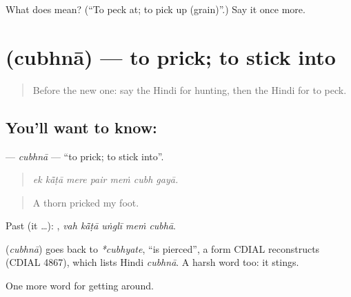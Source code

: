 \begin{tcolorbox}[breakable,colback=teal!4,colframe=teal!35!black,title={Before you move on}]
What does  mean? (\textquotedblleft{}To peck at; to pick up (grain)\textquotedblright{}.) Say it once more.
\end{tcolorbox}
\section[\texorpdfstring{\hi{चुभना} (cubhnā)}{चुभना (cubhnā)}]{ (cubhnā) — to prick; to stick into}

\label{lesson:HI-C448-cubhna}



\begin{quote}
Before the new one: say the Hindi for hunting, then the Hindi for to peck.
\end{quote}

\subsection*{You'll want to know: }
\textbf{} — \emph{cubhnā} — \textquotedblleft{}to prick; to stick into\textquotedblright{}.

\begin{quote}
      
\end{quote}

\begin{quote}
\emph{ek kā̃ṭā mere pair meṁ cubh gayā.}
\end{quote}

\begin{quote}
A thorn pricked my foot.
\end{quote}

Past (it …):     , \emph{vah kā̃ṭā uṅglī meṁ cubhā}.

\begin{cousinweb}
\textbf{} (\emph{cubhnā}) goes back to \emph{*cubhyate}, \textquotedblleft{}is pierced\textquotedblright{}, a form CDIAL reconstructs (CDIAL 4867), which lists Hindi \emph{cubhnā}. A harsh word  too: it stings.
\end{cousinweb}

\begin{grammarlens}[title={What you've built}]
One more word for getting around.
\end{grammarlens}

